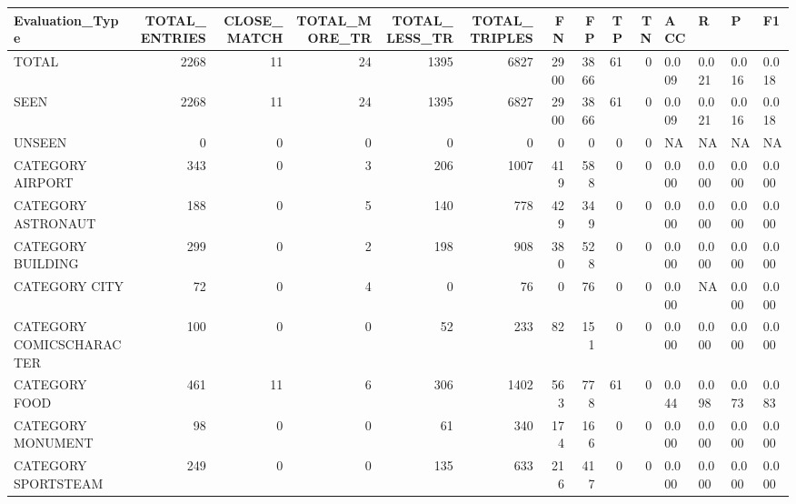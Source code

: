 \begin{tabular}{lrrrrrrrrrllll}
\hline
 Evaluation\_Type          &   TOTAL\_ENTRIES &   CLOSE\_MATCH &   TOTAL\_MORE\_TR &   TOTAL\_LESS\_TR &   TOTAL\_TRIPLES &   FN &   FP &   TP &   TN & ACC   & R     & P     & F1    \\
\hline
 TOTAL                    &            2268 &            11 &              24 &            1395 &            6827 & 2900 & 3866 &   61 &    0 & 0.009 & 0.021 & 0.016 & 0.018 \\
 SEEN                     &            2268 &            11 &              24 &            1395 &            6827 & 2900 & 3866 &   61 &    0 & 0.009 & 0.021 & 0.016 & 0.018 \\
 UNSEEN                   &               0 &             0 &               0 &               0 &               0 &    0 &    0 &    0 &    0 & NA    & NA    & NA    & NA    \\
 CATEGORY AIRPORT         &             343 &             0 &               3 &             206 &            1007 &  419 &  588 &    0 &    0 & 0.000 & 0.000 & 0.000 & 0.000 \\
 CATEGORY ASTRONAUT       &             188 &             0 &               5 &             140 &             778 &  429 &  349 &    0 &    0 & 0.000 & 0.000 & 0.000 & 0.000 \\
 CATEGORY BUILDING        &             299 &             0 &               2 &             198 &             908 &  380 &  528 &    0 &    0 & 0.000 & 0.000 & 0.000 & 0.000 \\
 CATEGORY CITY            &              72 &             0 &               4 &               0 &              76 &    0 &   76 &    0 &    0 & 0.000 & NA    & 0.000 & 0.000 \\
 CATEGORY COMICSCHARACTER &             100 &             0 &               0 &              52 &             233 &   82 &  151 &    0 &    0 & 0.000 & 0.000 & 0.000 & 0.000 \\
 CATEGORY FOOD            &             461 &            11 &               6 &             306 &            1402 &  563 &  778 &   61 &    0 & 0.044 & 0.098 & 0.073 & 0.083 \\
 CATEGORY MONUMENT        &              98 &             0 &               0 &              61 &             340 &  174 &  166 &    0 &    0 & 0.000 & 0.000 & 0.000 & 0.000 \\
 CATEGORY SPORTSTEAM      &             249 &             0 &               0 &             135 &             633 &  216 &  417 &    0 &    0 & 0.000 & 0.000 & 0.000 & 0.000 \\

\end{tabular}
